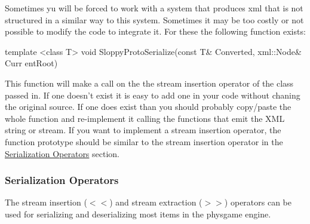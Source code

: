 Sometimes yu will be forced to work with a system that produces xml that is not structured in a similar way to this system. Sometimes it may be too costly or not possible to modify the code to integrate it. For these the following function exists: 
\begin{DoxyCode}
 template <class T> void SloppyProtoSerialize(const T& Converted, xml::Node& Curr
      entRoot)
\end{DoxyCode}
 This function will make a call on the the stream insertion operator of the class passed in. If one doesn't exist it is easy to add one in your code without chaning the original source. If one does exist than you should probably copy/paste the whole function and re-\/implement it calling the functions that emit the XML string or stream. If you want to implement a stream insertion operator, the function prototype should be similar to the stream insertion operator in the \hyperlink{Serialization_serializationoperators}{Serialization Operators} section. \hypertarget{Serialization_serializationoperators}{}\subsubsection{Serialization Operators}\label{Serialization_serializationoperators}
The stream insertion ($<$$<$) and stream extraction ($>$$>$) operators can be used for serializing and deserializing most items in the physgame engine.

